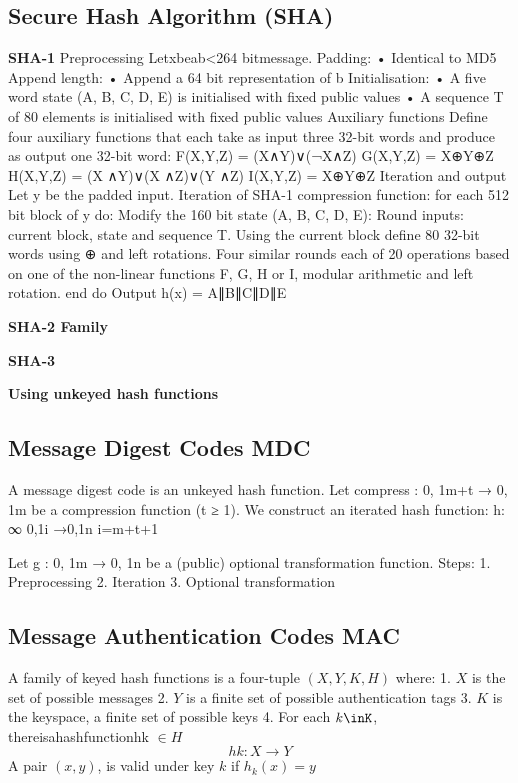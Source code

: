 \subsection{Secure Hash Algorithm (SHA)}
\textbf{SHA-1}
Preprocessing
Letxbeab<264 bitmessage. Padding:
• Identical to MD5 Append length:
• Append a 64 bit representation of b Initialisation:
• A five word state (A, B, C, D, E) is initialised with fixed public values • A sequence T of 80 elements is initialised with fixed public values
Auxiliary functions
Define four auxiliary functions that each take as input three 32-bit words and produce as output one 32-bit word:
F(X,Y,Z) = (X∧Y)∨(¬X∧Z) G(X,Y,Z) = X⊕Y⊕Z
H(X,Y,Z) = (X ∧Y)∨(X ∧Z)∨(Y ∧Z) I(X,Y,Z) = X⊕Y⊕Z
Iteration and output
Let y be the padded input.
Iteration of SHA-1 compression function:
for each 512 bit block of y do:
Modify the 160 bit state (A, B, C, D, E):
Round inputs: current block, state and sequence T.
Using the current block define 80 32-bit words using ⊕ and left rotations.
Four similar rounds each of 20 operations based on one of the non-linear functions F, G, H or I, modular arithmetic and left rotation.
end do
Output h(x) = A∥B∥C∥D∥E

\textbf{SHA-2 Family}

\textbf{SHA-3}

\textbf{Using unkeyed hash functions}\\

\subsection{Message Digest Codes {MDC}}
A message digest code is an unkeyed hash function.
Let compress : {0, 1}m+t → {0, 1}m be a compression function (t ≥ 1). We construct an iterated hash function:
h: \bigcup ∞ {0,1}i →{0,1}n i=m+t+1

Let g : {0, 1}m → {0, 1}n be a (public) optional transformation function. Steps:
1. Preprocessing
2. Iteration
3. Optional transformation

\subsection{Message Authentication Codes {MAC}}
\begin{definition}
    A family of keyed hash functions is a four-tuple $(X,Y,K,H)$ where:
    1. $X$ is the set of possible messages
    2. $Y$ is a finite set of possible authentication tags
    3. $K$ is the keyspace, a finite set of possible keys
    4. For each $k\inK$, thereisahashfunctionhk $\in H$
    $$hk : X \rightarrow Y$$
    A pair $(x,y)$, is valid under key $k$ if $h_k(x) = y$
\end{definition}

